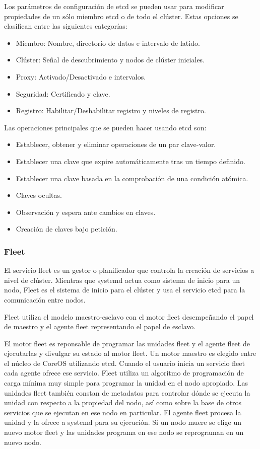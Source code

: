Los parámetros de configuración de etcd se pueden usar para modificar propiedades de un sólo miembro etcd o de todo el clúster. Estas opciones se clasifican entre las siguientes categorías:

\begin{itemize}
\item Miembro: Nombre, directorio de datos e intervalo de latido.
\item Clúster: Señal de descubrimiento y nodos de clúster iniciales.
\item Proxy: Activado/Desactivado e intervalos.
\item Seguridad: Certificado y clave.
\item Registro: Habilitar/Deshabilitar registro y niveles de registro.
\end{itemize}

Las operaciones principales que se pueden hacer usando etcd son:

\begin{itemize}
\item Establecer, obtener y eliminar operaciones de un par clave-valor.
\item Establecer una clave que expire automáticamente tras un tiempo definido. 
\item Establecer una clave basada en la comprobación de una condición atómica.
\item Claves ocultas.
\item Observación y espera ante cambios en claves.
\item Creación de claves bajo petición.
\end{itemize}

\subsubsection{Fleet}

El servicio fleet es un gestor o planificador que controla la creación de servicios a nivel de clúster. Mientras que systemd actua como sistema de inicio para un nodo, Fleet es el sistema de inicio para el clúster y usa el servicio etcd para la comunicación entre nodos.

Fleet utiliza el modelo maestro-esclavo con el motor fleet desempeñando el papel de maestro y el agente fleet representando el papel de esclavo.

El motor fleet es reponsable de programar las unidades fleet y el agente fleet de ejecutarlas y divulgar su estado al motor fleet. Un motor maestro es elegido entre el núcleo de CoreOS utilizando etcd. Cuando el usuario inicia un servicio fleet cada agente ofrece ese servicio. Fleet utiliza un algoritmo de programación de carga mínima muy simple para programar la unidad en el nodo apropiado. Las unidades fleet también constan de metadatos para controlar dónde se ejecuta la unidad con respecto a la propiedad del nodo, así como sobre la base de otros servicios que se ejecutan en ese nodo en particular. El agente fleet procesa la unidad y la ofrece a systemd para su ejecución. Si un nodo muere se elige un nuevo motor fleet y las unidades programa en ese nodo se reprograman en un nuevo nodo. 


